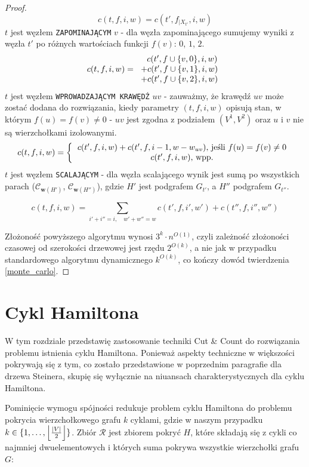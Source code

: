 \documentclass[12pt, oneside]{report}
\newcommand\Omicron{O}
\DeclarePairedDelimiter\floor{\lfloor}{\rfloor}
\begin{document}
\begin{proof}
$$c(t,f,i,w) = c(t',f_{\big|X_{t'}},i,w)$$
\newline
$t$ jest węzłem \texttt{ZAPOMINAJĄCYM} $v$ - dla węzła zapominającego sumujemy wyniki z węzła $t'$ po różnych wartościach funkcji $f(v)$: $0$, $1$, $2$.
\[
c(t,f,i,w) =  
  \begin{tabular}{ccc}
  $\ \ c(t',f \cup \{v, 0\},i,w)$\\
  $+ c(t',f \cup \{v, 1\},i,w)$\\
  $+ c(t',f \cup \{v, 2\},i,w)$
  \end{tabular}
\]
\newline
$t$ jest węzłem \texttt{WPROWADZAJĄCYM KRAWĘDŹ} $uv$ - zauważmy, że krawędź $uv$ może zostać dodana do rozwiązania, kiedy parametry $(t,f,i,w)$ opisują stan, w którym $f(u) = f(v) \neq 0$ - $uv$ jest zgodna z podziałem $(V^1, V^2)$ oraz $u$ i $v$ nie są wierzchołkami izolowanymi.
\[
c(t,f,i,w) =  
\left \{
  \begin{tabular}{ccc}
  $c(t',f,i,w) + c(t',f,i-1,w-w_{uv})$, jeśli $f(u) = f(v) \neq 0$ \\
  $c(t',f,i,w)$, wpp. \\
  \end{tabular}
\right. 
\]
$t$ jest węzłem \texttt{SCALAJĄCYM} - dla węzła scalającego wynik jest sumą po wszystkich parach ($\mathcal{C}_{\mathbf{w}(H')}$, $\mathcal{C}_{\mathbf{w}(H'')}$), gdzie $H'$ jest podgrafem $G_{t'}$, a $H''$ podgrafem $G_{t''}$.

$$c(t,f,i,w) = \sum_{i' + i'' = i, \quad w' + w'' = w} c(t',f,i',w') + c(t'',f,i'',w'')$$

Złożoność powyższego algorytmu wynosi $3^k \cdot n^{\Omicron(1)}$, czyli zależność złożoności czasowej od szerokości drzewowej jest rzędu $2^{\Omicron(k)}$, a nie jak w przypadku standardowego algorytmu dynamicznego $k^{\Omicron(k)}$, co kończy dowód twierdzenia \ref{monte_carlo}.
\end{proof}

    	\section{Cykl Hamiltona}

W tym rozdziale przedstawię zastosowanie techniki Cut \& Count do rozwiązania problemu istnienia cyklu Hamiltona. Ponieważ aspekty techniczne w większości pokrywają się z tym, co zostało przedstawione w poprzednim paragrafie dla drzewa Steinera, skupię się wyłącznie na niuansach charakterystycznych dla cyklu Hamiltona.

Pominięcie wymogu spójności redukuje problem cyklu Hamiltona do problemu pokrycia wierzchołkowego grafu $k$ cyklami, gdzie w naszym przypadku $k \in \{1, \ldots, \floor*{\frac{|V|}{2}}\}$. Zbiór $\mathcal{R}$ jest zbiorem pokryć $H$, które składają się z cykli co najmniej dwuelementowych i których suma pokrywa wszystkie wierzchołki grafu $G$:
\end{document}
